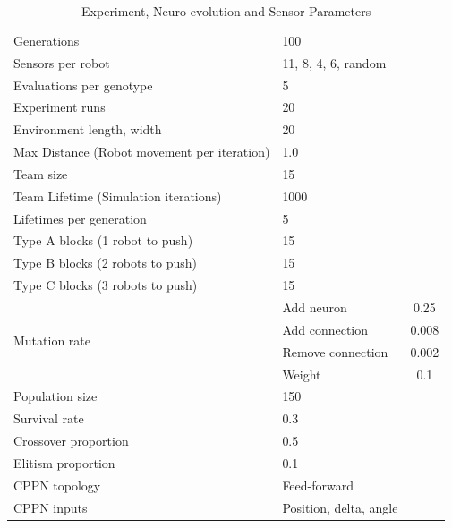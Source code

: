 \documentclass[conference]{IEEEtran}
\begin{document}
\begin{table}
	\renewcommand{\arraystretch}{1.30}
	\caption{Experiment, Neuro-evolution and Sensor Parameters}\label{tab:simParameters}
	\centering
	\begin{tabular}{llc}
		\hline
		Generations	                                           & 100	\\
		Sensors per robot                                      & 11, 8, 4, 6, random \\	
		Evaluations per genotype                               & 5  \\
		Experiment runs                                        & 20 \\
		Environment length, width                              & 20 \\
        Max Distance (Robot movement per iteration)            & 1.0 \\
        Team size                                              & 15 \\
        Team Lifetime (Simulation iterations)                  & 1000 \\	
        Lifetimes per generation                               & 5 \\
        Type A blocks (1 robot to push)                        & 15 \\
        Type B blocks (2 robots to push)                       & 15 \\
        Type C blocks (3 robots to push)                       & 15 \\
		\hline
		\multirow{4}{*}{Mutation rate} & Add neuron            & 0.25 \\
		& Add connection                                       & 0.008  \\
		& Remove connection                                    & 0.002 \\
		& Weight                                               & 0.1  \\
		Population size                                        & 150 \\
		Survival rate                                          & 0.3 \\
		Crossover proportion                                   & 0.5 \\
		Elitism proportion                                     & 0.1 \\
		CPPN topology                                          & Feed-forward           \\
		CPPN inputs                                            & Position, delta, angle \\

\end{tabular}
\end{table}
\end{document}
